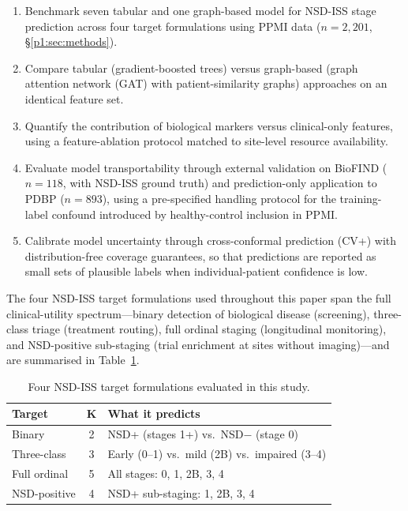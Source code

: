 \begin{enumerate}
    \item Benchmark seven tabular and one graph-based model for NSD-ISS stage prediction across four target formulations using PPMI data ($n{=}2{,}201$, \S\ref{p1:sec:methods}).
    \item Compare tabular (gradient-boosted trees) versus graph-based (graph attention network (GAT) with patient-similarity graphs) approaches on an identical feature set.
    \item Quantify the contribution of biological markers versus clinical-only features, using a feature-ablation protocol matched to site-level resource availability.
    \item Evaluate model transportability through external validation on BioFIND ($n{=}118$, with NSD-ISS ground truth) and prediction-only application to PDBP ($n{=}893$), using a pre-specified handling protocol for the training-label confound introduced by healthy-control inclusion in PPMI.
    \item Calibrate model uncertainty through cross-conformal prediction (CV+) with distribution-free coverage guarantees, so that predictions are reported as small sets of plausible labels when individual-patient confidence is low.
\end{enumerate}

\noindent The four NSD-ISS target formulations used throughout this paper span the full clinical-utility spectrum---binary detection of biological disease (screening), three-class triage (treatment routing), full ordinal staging (longitudinal monitoring), and NSD-positive sub-staging (trial enrichment at sites without imaging)---and are summarised in Table~\ref{p1:tab:targets}.

\begin{table}[t]
\centering
\caption{Four NSD-ISS target formulations evaluated in this study.}
\label{p1:tab:targets}
\scriptsize
\setlength{\tabcolsep}{3pt}
\begin{tabular}{@{}lcp{4.2cm}@{}}
\toprule
\textbf{Target} & \textbf{K} & \textbf{What it predicts} \\
\midrule
Binary       & 2 & NSD+ (stages 1+) vs.\ NSD$-$ (stage 0) \\
Three-class  & 3 & Early (0--1) vs.\ mild (2B) vs.\ impaired (3--4) \\
Full ordinal & 5 & All stages: 0, 1, 2B, 3, 4 \\
NSD-positive & 4 & NSD+ sub-staging: 1, 2B, 3, 4 \\
\bottomrule
\end{tabular}
\end{table}


